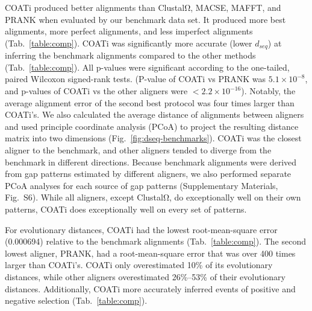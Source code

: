 \documentclass[12pt,letterpaper]{article}
\begin{document}
COATi produced better alignments than ClustalΩ, MACSE, MAFFT, and PRANK when evaluated by our benchmark data set. It produced more best alignments, more perfect alignments, and less imperfect alignments (Tab.~\ref{table:comp}).
%
COATi was significantly more accurate (lower $d_{seq}$) at inferring the benchmark alignments compared to the other methods (Tab.~\ref{table:comp}). All p-values were significant according to the one-tailed, paired Wilcoxon signed-rank tests. (P-value of COATi vs PRANK was $5.1 \times 10^{-8}$, and p-values of COATi vs the other aligners were $< 2.2 \times 10^{-16}$). Notably, the average alignment error of the second best protocol was four times larger than COATi's. We also calculated the average distance of alignments between aligners and used principle coordinate analysis (PCoA) to project the resulting distance matrix into two dimensions (Fig.~\ref{fig:dseq-benchmarks}). COATi was the closest aligner to the benchmark, and other aligners tended to diverge from the benchmark in different directions. Because benchmark alignments were derived from gap patterns estimated by different aligners, we also performed separate PCoA analyses for each source of gap patterns (Supplementary Materials, Fig.~S6). While all aligners, except ClustalΩ, do exceptionally well on their own patterns, COATi does exceptionally well on every set of patterns.

For evolutionary distances, COATi had the lowest root-mean-square error (0.000694) relative to the benchmark alignments (Tab.~\ref{table:comp}). The second lowest aligner, PRANK, had a root-mean-square error that was over 400 times larger than COATi's. COATi only overestimated  10\% of its evolutionary distances, while other aligners overestimated 26\%--53\% of their evolutionary distances.
%
Additionally, COATi more accurately inferred events of positive and negative selection (Tab.~\ref{table:comp}).
\end{document}
